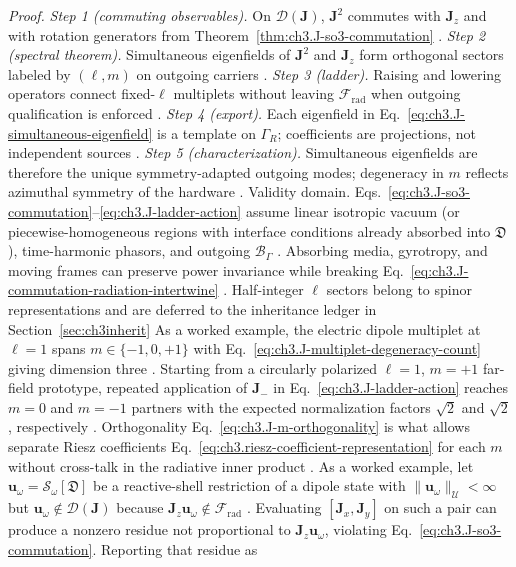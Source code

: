 \noindent\textit{Proof.}
\emph{Step 1 (commuting observables).} On \(\mathcal{D}(\mathbf{J})\), \(\mathbf{J}^{2}\) commutes with \(\mathbf{J}_{z}\) and with rotation generators from Theorem~\ref{thm:ch3.J-so3-commutation} .
\emph{Step 2 (spectral theorem).} Simultaneous eigenfields of \(\mathbf{J}^{2}\) and \(\mathbf{J}_{z}\) form orthogonal sectors labeled by \((\ell,m)\) on outgoing carriers .
\emph{Step 3 (ladder).} Raising and lowering operators connect fixed-\(\ell\) multiplets without leaving \(\mathcal{F}_{\mathrm{rad}}\) when outgoing qualification is enforced .
\emph{Step 4 (export).} Each eigenfield in Eq.~\eqref{eq:ch3.J-simultaneous-eigenfield} is a template on \(\Gamma_R\); coefficients are projections, not independent sources .
\emph{Step 5 (characterization).} Simultaneous eigenfields are therefore the unique symmetry-adapted outgoing modes; degeneracy in \(m\) reflects azimuthal symmetry of the hardware .
Validity domain. Eqs.~\eqref{eq:ch3.J-so3-commutation}--\eqref{eq:ch3.J-ladder-action} assume linear isotropic vacuum
(or piecewise-homogeneous regions with interface conditions already absorbed into \(\mathfrak{D}\)),
time-harmonic phasors, and outgoing \(\mathcal{B}_\Gamma\) . Absorbing media,
gyrotropy, and moving frames can preserve power invariance while breaking
Eq.~\eqref{eq:ch3.J-commutation-radiation-intertwine} . Half-integer \(\ell\) sectors
belong to spinor representations and are deferred to the inheritance ledger in Section~\ref{sec:ch3inherit}
As a worked example, the electric dipole multiplet at \(\ell=1\) spans \(m\in\{-1,0,+1\}\) with
Eq.~\eqref{eq:ch3.J-multiplet-degeneracy-count} giving dimension three . Starting
from a circularly polarized \(\ell=1\), \(m=+1\) far-field prototype, repeated application of
\(\mathbf{J}_{-}\) in Eq.~\eqref{eq:ch3.J-ladder-action} reaches \(m=0\) and \(m=-1\) partners with the expected
normalization factors \(\sqrt{2}\) and \(\sqrt{2}\), respectively . Orthogonality
Eq.~\eqref{eq:ch3.J-m-orthogonality} is what allows separate Riesz coefficients
Eq.~\eqref{eq:ch3.riesz-coefficient-representation} for each \(m\) without cross-talk in the radiative inner
product .
As a worked example, let \(\mathbf{u}_\omega=\mathcal{S}_\omega[\mathfrak{D}]\) be a reactive-shell restriction of a dipole state
with \(\|\mathbf{u}_\omega\|_{\mathcal{U}}<\infty\) but \(\mathbf{u}_\omega\notin\mathcal{D}(\mathbf{J})\) because
\(\mathbf{J}_{z}\mathbf{u}_\omega\notin\mathcal{F}_{\mathrm{rad}}\) . Evaluating
\([\mathbf{J}_{x},\mathbf{J}_{y}]\) on such a pair can produce a nonzero residue not proportional to
\(\mathbf{J}_{z}\mathbf{u}_\omega\), violating Eq.~\eqref{eq:ch3.J-so3-commutation}. Reporting that residue as
